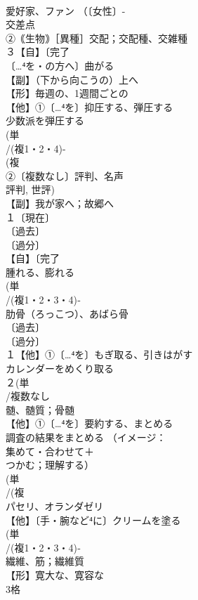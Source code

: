 \documentclass[8pt]{extreport}
\begin{document}
\begin{CJK}{UTF8}{min}
\\	愛好家、ファン （〔女性〕-
\\	交差点 
\\	②｟生物｠［異種］交配；交配種、交雑種 
\\	３【自】〔完了
\\	〔…⁴を・の方へ〕曲がる
\\	【副】（下から向こうの）上へ 
\\	【形】毎週の、1週間ごとの 
\\	【他】①〔…⁴を〕抑圧する、弾圧する 
\\	少数派を弾圧する
\\	(単
\\	/(複1・2・4)-
\\	(複
\\	②〔複数なし〕評判、名声 
\\	評判, 世評)
\\	【副】我が家へ；故郷へ 
\\	１〔現在〕
\\	〔過去〕
\\	〔過分〕
\\	【自】〔完了
\\	腫れる、膨れる 
\\	(単
\\	/(複1・2・3・4)‐
\\	肋骨（ろっこつ）、あばら骨 
\\	〔過去〕
\\	〔過分〕
\\	１【他】①〔…⁴を〕もぎ取る、引きはがす 
\\	カレンダーをめくり取る
\\	２(単
\\	/複数なし 
\\	髄、髄質；骨髄
\\	【他】①〔…⁴を〕要約する、まとめる 
\\	調査の結果をまとめる （イメージ：
\\	集めて・合わせて＋
\\	つかむ；理解する）
\\	(単
\\	/(複
\\	パセリ、オランダゼリ 
\\	【他】〔手・腕など⁴に〕クリームを塗る 
\\	(単
\\	/(複1・2・3・4)‐
\\	繊維、筋；繊維質 
\\	【形】寛大な、寛容な 
\\	3格 

\end{CJK}
\end{document}
